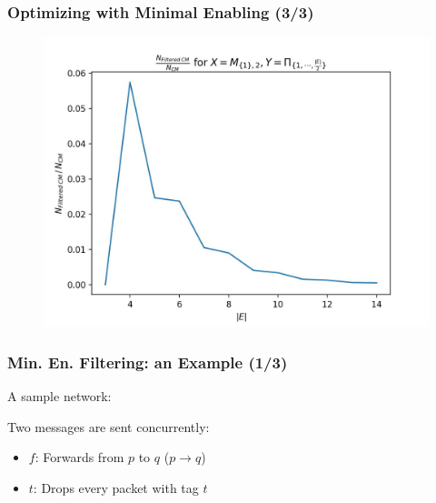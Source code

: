\documentclass{beamer}
\begin{document}
\begin{frame}
\frametitle{Optimizing with Minimal Enabling (3/3)}

\begin{figure}
\centering
\includegraphics[scale=0.5]{plt/plt_m12_pi_half.jpg}
\end{figure}
\end{frame}

\begin{frame}
\frametitle{Min. En. Filtering: an Example (1/3)}

A sample network:

\begin{center}
\end{center}

Two messages are sent concurrently:

\begin{itemize}
  \item $f$: Forwards from $p$ to $q$ ($p \rightarrow q$)
  \item $t$: Drops every packet with tag $t$
\end{itemize}

\end{frame}
\end{document}
